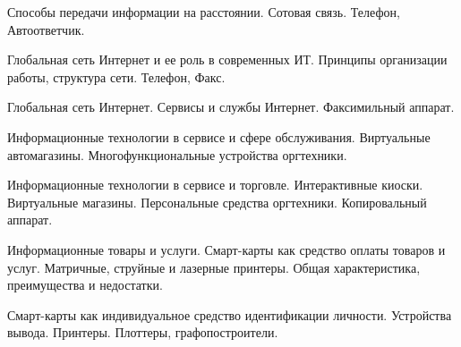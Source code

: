 \documentclass[
	14pt,
	a4paper,
	]
	{scrartcl}
\begin{document}
\vfill
\z Способы передачи информации на расстоянии. Сотовая связь.
 \vfill
\z Телефон, Автоответчик.
 \vfill

\vfill

\newpage


\shapk
{}
\setcounter{zad}{0}

\vfill
\z Глобальная сеть Интернет и ее роль в современных ИТ. Принципы организации работы, структура сети.
 \vfill
\z Телефон, Факс.
 \vfill

\vfill

\newpage


\shapk
{}
\setcounter{zad}{0}

\vfill
\z Глобальная сеть Интернет. Сервисы и службы Интернет.
 \vfill
\z Факсимильный аппарат.
 \vfill

\vfill

\newpage


\shapk
{}
\setcounter{zad}{0}

\vfill
\z Информационные технологии в сервисе и сфере обслуживания. Виртуальные автомагазины.
 \vfill
\z Многофункциональные устройства оргтехники.
 \vfill

\vfill

\newpage


\shapk
{}
\setcounter{zad}{0}

\vfill
\z Информационные технологии в сервисе и торговле. Интерактивные киоски. Виртуальные магазины.
 \vfill
\z Персональные средства оргтехники. Копировальный аппарат.
 \vfill

\vfill

\newpage


\shapk
{}
\setcounter{zad}{0}

\vfill
\z Информационные товары и услуги. Смарт-карты как средство оплаты товаров и услуг.
 \vfill
\z Матричные, струйные и лазерные принтеры. Общая характеристика, преимущества и недостатки.
 \vfill

\vfill

\newpage


\shapk
{}
\setcounter{zad}{0}

\vfill
\z Смарт-карты как индивидуальное средство идентификации личности.
 \vfill
\z Устройства вывода. Принтеры. Плоттеры, графопостроители.
 \vfill

\vfill

\newpage
\end{document}
